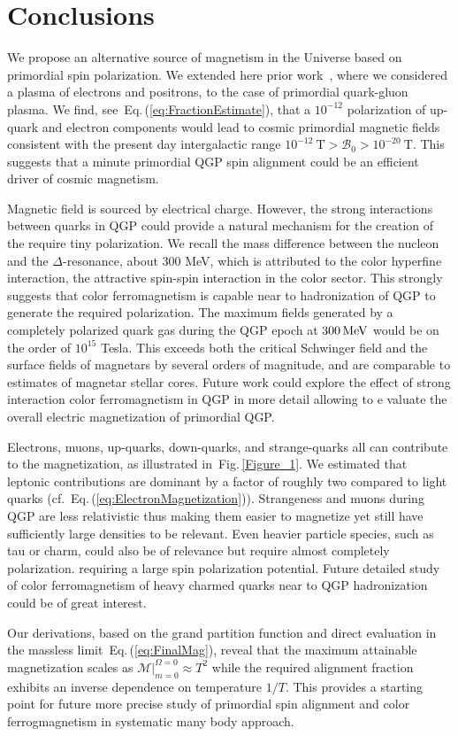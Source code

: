 \documentclass[epjST]{svjour}
\newcommand*{\MeV}{\text{\,MeV}}
\newcommand{\req}[1]{Eq.\,(\ref{#1})}
\newcommand{\rf}[1]{Fig.\,{\ref{#1}}}
\begin{document}
\section{Conclusions}
\label{sec:conclusions}
{\color{blue}We propose an alternative source of magnetism in the Universe based on primordial spin polarization. We extended here prior work~\cite{Steinmetz:2023nsc}, where we considered a plasma of electrons and positrons, to the case of primordial quark-gluon plasma. We find, see~\req{eq:FractionEstimate}, that a $10^{-12}$ polarization of up-quark and electron components would lead to cosmic primordial magnetic fields consistent with the present day intergalactic range \(10^{-12}~\mathrm{T} > \mathcal{B}_{0} > 10^{-20}~\mathrm{T}\). This suggests that a minute primordial QGP spin alignment could be an efficient driver of cosmic magnetism.

Magnetic field is sourced by electrical charge. However, the strong interactions between quarks in QGP could provide a natural mechanism for the creation of the require tiny polarization. We recall the mass difference between the nucleon and the $\Delta$-resonance, about 300 MeV, which is attributed to the color hyperfine interaction, the attractive spin-spin interaction in the color sector. This strongly suggests that color ferromagnetism is capable near to hadronization of QGP to generate the required polarization. The maximum fields generated by a completely polarized quark gas during the QGP epoch at \(300\MeV\) would be on the order of \(10^{15}\) Tesla. This exceeds both the critical Schwinger field and the surface fields of magnetars by several orders of magnitude, and are comparable to estimates of magnetar stellar cores. Future work could explore the effect  of strong interaction color ferromagnetism in QGP in more detail allowing to e valuate the overall electric magnetization of primordial QGP. 

Electrons, muons, up-quarks, down-quarks, and strange-quarks all can contribute to the magnetization, as illustrated in~\rf{Figure_1}. We estimated that leptonic contributions are dominant by a factor of roughly two compared to light quarks (cf.~\req{eq:ElectronMagnetization}). Strangeness and muons during QGP are less relativistic thus making them easier to magnetize  yet still have sufficiently large densities to be relevant. Even heavier particle species, such as tau or charm, could also be of relevance but require  almost completely polarization. requiring a large spin polarization potential. Future detailed study of color ferromagnetism of heavy charmed quarks near to QGP hadronization could be of great interest.

Our derivations, based on the grand partition function and direct evaluation  in the massless limit~\req{eq:FinalMag}, reveal that the maximum attainable magnetization scales as $\mathcal{M}\vert_{m=0}^{\Omega=0} \approx T^{2}$ while the required alignment fraction exhibits an inverse dependence on temperature \(1/T\). This provides a starting point for future more precise study of primordial spin alignment and color ferrogmagnetism in systematic many body approach.}\\
\end{document}
